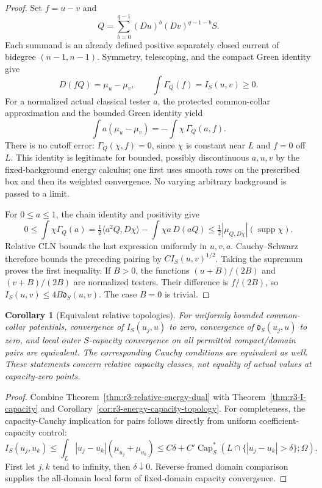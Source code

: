 \documentclass[11pt,a4paper]{article}
\numberwithin{equation}{section}
\newtheorem{corollary}[theorem]{Corollary}
\theoremstyle{definition}
\theoremstyle{remark}
\begin{document}
\begin{proof}
Set $f=u-v$ and
\[
 Q=\sum_{b=0}^{q-1}(Du)^b(Dv)^{q-1-b}S .
\]
Each summand is an already defined positive separately closed
current of bidegree $(n-1,n-1)$. Symmetry, telescoping, and the
compact Green identity give
\[
 D(fQ)=\mu_u-\mu_v,\qquad
 \int\Gamma_Q(f)=I_S(u,v)\geq0 .
\]
For a normalized actual classical tester $a$, the protected
common-collar approximation and the bounded Green identity yield
\[
 \int a(\mu_u-\mu_v)=-\int\chi\,\Gamma_Q(a,f).
\]
There is no cutoff error: $\Gamma_Q(\chi,f)=0$, since $\chi$ is
constant near $L$ and $f=0$ off $L$. This identity is legitimate
for bounded, possibly discontinuous $a,u,v$ by the fixed-background
energy calculus; one first uses smooth rows on the prescribed box
and then its weighted convergence. No varying arbitrary background
is passed to a limit.

For $0\leq a\leq1$, the chain identity and positivity give
\[
 0\leq\int\chi\Gamma_Q(a)
 =\tfrac12\langle a^2Q,D\chi\rangle
                  -\int\chi a\,D(aQ)
 \leq\tfrac12|\mu_{Q,D\chi}|(\operatorname{supp}\chi).
\]
Relative CLN bounds the last expression uniformly in $u,v,a$.
Cauchy--Schwarz therefore bounds the preceding pairing by
$C I_S(u,v)^{1/2}$. Taking the supremum proves the first inequality.
If $B>0$, the functions $(u+B)/(2B)$ and $(v+B)/(2B)$ are
normalized testers. Their difference is $f/(2B)$, so
$I_S(u,v)\leq4B\mathfrak d_S(u,v)$. The case $B=0$ is trivial.
\end{proof}

\begin{corollary}[Equivalent relative topologies]
\label{cor:r3-strong-relative-topology}
For uniformly bounded common-collar potentials, convergence of
$I_S(u_j,u)$ to zero, convergence of $\mathfrak d_S(u_j,u)$ to
zero, and local outer $S$-capacity convergence on all permitted
compact/domain pairs are equivalent. The corresponding Cauchy
conditions are equivalent as well. These statements concern
relative capacity classes, not equality of actual values at
capacity-zero points.
\end{corollary}

\begin{proof}
Combine Theorem~\ref{thm:r3-relative-energy-dual} with
Theorem~\ref{thm:r3-I-capacity} and
Corollary~\ref{cor:r3-energy-capacity-topology}. For completeness,
the capacity-Cauchy implication for pairs follows directly from
uniform coefficient-capacity control:
\[
 I_S(u_j,u_k)
 \leq\int_L|u_j-u_k|(\mu_{u_j}+\mu_{u_k})
 \leq C\delta+
 C'\operatorname{Cap}_S^*(L\cap\{|u_j-u_k|>\delta\};\Omega).
\]
First let $j,k$ tend to infinity, then $\delta\downarrow0$.
Reverse framed domain comparison supplies the all-domain local
form of fixed-domain capacity convergence.
\end{proof}
\end{document}
